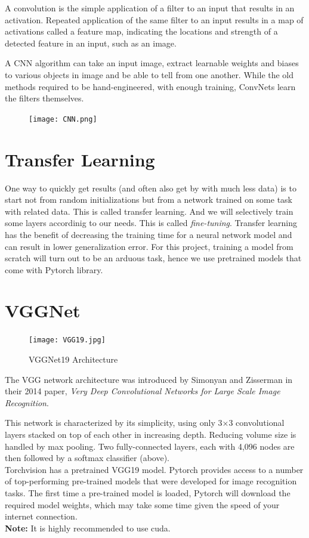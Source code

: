\documentclass[oneside]{book}
\begin{document}
A convolution is the simple application of a filter to an input that results in an activation. Repeated application of the same filter to an input results in a map of activations called a feature map, indicating the locations and strength of a detected feature in an input, such as an image.

A CNN algorithm can take an input image, extract learnable weights and biases to various objects in image and be able to tell from one another.
While the old methods required to be hand-engineered, with enough training, ConvNets learn the filters themselves. 


\begin{figure}[h]
\centering
\texttt{[image: CNN.png]}
\end{figure}


\section*{Transfer Learning}
One way to quickly get results (and often also get by with much less data) is to start not
from random initializations but from a network trained on some task with related data.
This is called transfer learning.
And we will selectively train some layers accordinig to our needs. This is called \emph{fine-tuning}.
Transfer learning has the benefit of decreasing the training time for a neural network model and can result in lower generalization error.
For this project, training a model from scratch will turn out to be an arduous task, hence we use pretrained models that come with Pytorch library.
\pagebreak
\section*{VGGNet}
\begin{figure}[h]
\centering
\texttt{[image: VGG19.jpg]}
{\caption*{VGGNet19 Architecture}}
\end{figure}
The VGG network architecture was introduced by Simonyan and Zisserman in their 2014 paper, \emph{Very Deep Convolutional Networks for Large Scale Image Recognition}.

This network is characterized by its simplicity, using only 3×3 convolutional layers stacked on top of each other in increasing depth. Reducing volume size is handled by max pooling. Two fully-connected layers, each with 4,096 nodes are then followed by a softmax classifier (above).\\

Torchvision has a pretrained VGG19 model. Pytorch provides access to a number of top-performing pre-trained models that were developed for image recognition tasks.
The first time a pre-trained model is loaded, Pytorch will download the required model weights, which may take some time given the speed of your internet connection.
\\
\textbf{Note:}
It is highly recommended to use cuda.
\end{document}
